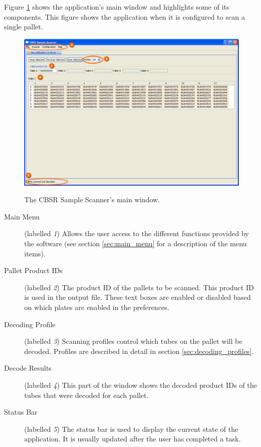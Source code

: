 Figure \ref{fig:main_window} shows the application's main window and highlights
some of its components. This figure shows the application when it is configured
to scan a single pallet.
\begin{figure}[H]
  \centering
  \scalebox{0.35}
	   { \includegraphics*{screenshots/overview/main_window} }
	   \caption{The CBSR Sample Scanner's main window.}
	   \label{fig:main_window}
\end{figure}
\begin{description}
\item[Main Menu] (labelled \emph{1}) Allows the user access to the
  different functions provided by the software (see section \ref{sec:main_menu}
  for a description of the menu items).
\item [Pallet Product IDs] (labelled \emph{2}) The product ID of the
  pallets to be scanned. This product ID is used in the output file. These text
  boxes are enabled or disabled based on which plates are enabled in the
  preferences.
\item [Decoding Profile] (labelled \emph{3}) Scanning profiles control which
  tubes on the pallet will be decoded. Profiles are described in detail in
  section \ref{sec:decoding_profiles}.
\item [Decode Results] (labelled \emph{4}) This part of the window shows the
  decoded product IDs of the tubes that were decoded for each pallet.
\item [Status Bar] (labelled \emph{5}) The status bar is used to display the
  current state of the application. It is usually updated after the user has
  completed a task.
\end{description}

